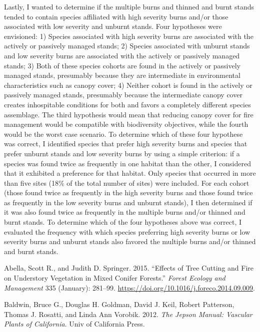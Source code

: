 \documentclass[]{article}
\begin{document}
Lastly, I wanted to determine if the multiple burns and thinned and
burnt stands tended to contain species affiliated with high severity
burns and/or those associated with low severity and unburnt stands. Four
hypotheses were envisioned: 1) Species associated with high severity
burns are associated with the actively or passively managed stands; 2)
Species associated with unburnt stands and low severity burns are
associated with the actively or passively managed stands; 3) Both of
these species cohorts are found in the actively or passively managed
stands, presumably because they are intermediate in environmental
characteristics such as canopy cover; 4) Neither cohort is found in the
actively or passively managed stands, presumably because the
intermediate canopy cover creates inhospitable conditions for both and
favors a completely different species assemblage. The third hypothesis
would mean that reducing canopy cover for fire management would be
compatible with biodiversity objectives, while the fourth would be the
worst case scenario. To determine which of these four hypothese was
correct, I identified species that prefer high severity burns and
species that prefer unburnt stands and low severity burns by using a
simple criterion: if a species was found twice as frequently in one
habitat than the other, I considered that it exhibited a preference for
that habitat. Only species that occurred in more than five sites (18\%
of the total number of sites) were included. For each cohort (those
found twice as frequently in the high severity burns and those found
twice as frequently in the low severity burns and unburnt stands), I
then determined if it was also found twice as frequently in the multiple
burns and/or thinned and burnt stands. To determine which of the four
hypotheses above was correct, I evaluated the frequency with which
species preferring high severity burns or low severity burns and unburnt
stands also favored the multiple burns and/or thinned and burnt stands.

\hypertarget{refs}{}
\leavevmode\hypertarget{ref-abellaEffectsTreeCutting2015}{}%
Abella, Scott R., and Judith D. Springer. 2015. ``Effects of Tree
Cutting and Fire on Understory Vegetation in Mixed Conifer Forests.''
\emph{Forest Ecology and Management} 335 (January): 281--99.
\url{https://doi.org/10.1016/j.foreco.2014.09.009}.

\leavevmode\hypertarget{ref-baldwinJepsonManualVascular2012}{}%
Baldwin, Bruce G., Douglas H. Goldman, David J. Keil, Robert Patterson,
Thomas J. Rosatti, and Linda Ann Vorobik. 2012. \emph{The Jepson Manual:
Vascular Plants of California}. Univ of California Press.
\end{document}
